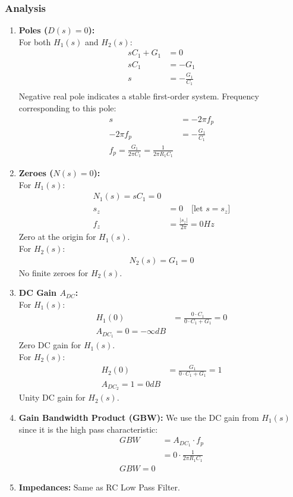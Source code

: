 \subsubsection{Analysis}
\begin{enumerate}
  \item \textbf{Poles (\(D(s) = 0\)):} \\
    For both \(H_1(s)\) and \(H_2(s)\):
    \begin{align*}
      sC_1 + G_1 &= 0 \\
      sC_1 &= -G_1 \\
      s &= -\frac{G_1}{C_1} \\
    \end{align*}
    Negative real pole indicates a stable first-order system.
    Frequency corresponding to this pole:
    \begin{align*}
      s &= -2 \pi f_p \\
      -2 \pi f_p &= -\frac{G_1}{C_1} \\
      \boxed{f_p = \frac{G_1}{2 \pi C_1} = \frac{1}{2 \pi R_1 C_1}}
    \end{align*}
  \item \textbf{Zeroes (\(N(s) = 0\)):} \\
    For \(H_1(s)\):
    \begin{align*}
        N_1(s) = sC_1 = 0 \\
        s_z &= 0 \quad \text{[let \(s = s_z\)]} \\
        f_z &= \frac{|s_z|}{2\pi} = 0 Hz
    \end{align*}
    Zero at the origin for \(H_1(s)\). \\
    For \(H_2(s)\):
    \begin{align*}
      N_2(s) = G_1 = 0
    \end{align*}
    No finite zeroes for \(H_2(s)\).
  \item \textbf{DC Gain \(A_{DC}\):} \\
    For \(H_1(s)\):
    \begin{align*}
      H_1(0) &= \frac{0 \cdot C_1}{0 \cdot C_1 + G_1} = 0 \\
      \boxed{A_{DC_1} = 0 = -\infty dB}
    \end{align*}
    Zero DC gain for \(H_1(s)\). \\
    For \(H_2(s)\):
    \begin{align*}
      H_2(0) &= \frac{G_1}{0 \cdot C_1 + G_1} = 1 \\
      \boxed{A_{DC_2} = 1 = 0 dB}
    \end{align*}
    Unity DC gain for \(H_2(s)\).
  \item \textbf{Gain Bandwidth Product (GBW):}
    We use the DC gain from \(H_1(s)\) since it is
    the high pass characteristic:
    \begin{align*}
      GBW &= A_{DC_1} \cdot f_p \\
          &= 0 \cdot \frac{1}{2 \pi R_1 C_1} \\
      \boxed{GBW = 0}
    \end{align*}
  \item \textbf{Impedances:}
    Same as RC Low Pass Filter.
\end{enumerate}

